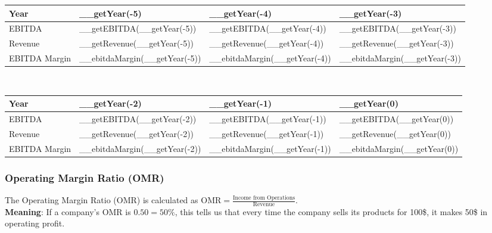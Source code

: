 \begin{tabularx}{\textwidth}{|X|X|X|X|}
 \hline
 Year                               & __getYear(-5)                 & __getYear(-4)                 & __getYear(-3)                 \\
 \hline
 EBITDA                             & __getEBITDA(__getYear(-5))    & __getEBITDA(__getYear(-4))    & __getEBITDA(__getYear(-3))    \\
 Revenue                            & __getRevenue(__getYear(-5))   & __getRevenue(__getYear(-4))   & __getRevenue(__getYear(-3))   \\
 \rowcolor{lightgray} EBITDA Margin & __ebitdaMargin(__getYear(-5)) & __ebitdaMargin(__getYear(-4)) & __ebitdaMargin(__getYear(-3)) \\
 \hline
\end{tabularx}\\

\begin{tabularx}{\textwidth}{|X|X|X|X|}
 \hline
 Year                               & __getYear(-2)                 & __getYear(-1)                 & __getYear(0)                 \\
 \hline
 EBITDA                             & __getEBITDA(__getYear(-2))    & __getEBITDA(__getYear(-1))    & __getEBITDA(__getYear(0))    \\
 Revenue                            & __getRevenue(__getYear(-2))   & __getRevenue(__getYear(-1))   & __getRevenue(__getYear(0))   \\
 \rowcolor{lightgray} EBITDA Margin & __ebitdaMargin(__getYear(-2)) & __ebitdaMargin(__getYear(-1)) & __ebitdaMargin(__getYear(0)) \\
 \hline
\end{tabularx}

\subsubsection{Operating Margin Ratio (OMR)}

The Operating Margin Ratio (OMR) is calculated as
$\text{OMR} = \frac{\text{Income from Operations}}{\text{Revenue}}$.\\
\textbf{Meaning}: If a company's OMR is $0.50 = 50\%$, this tells us that every
time the company sells its products for 100\$, it makes 50\$ in operating profit.\\

